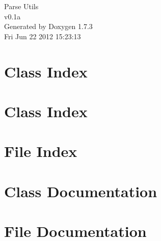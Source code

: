 \documentclass[a4paper]{book}
\begin{document}
\hypersetup{pageanchor=false}
\begin{titlepage}
\vspace*{7cm}
\begin{center}
{\Large Parse Utils \\[1ex]\large v0.1a }\\
\vspace*{1cm}
{\large Generated by Doxygen 1.7.3}\\
\vspace*{0.5cm}
{\small Fri Jun 22 2012 15:23:13}\\
\end{center}
\end{titlepage}
\clearemptydoublepage
{}
\tableofcontents
\clearemptydoublepage
{}
\hypersetup{pageanchor=true}
\chapter{Class Index}

\chapter{Class Index}

\chapter{File Index}

\chapter{Class Documentation}













\chapter{File Documentation}







































\printindex
\end{document}
